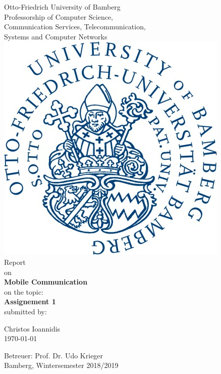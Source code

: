 \documentclass[10pt,a4paper]{article}
\author{Christos Ioannidis}
\begin{document}
\begin{titlepage}
		\begin{center}
		\small Otto-Friedrich University of Bamberg\\
		\vspace{5mm}
		\LARGE Professorship of Computer Science,\\
		Communication Services, Telecommunication,\\
		Systems and Computer Networks\\
		\vspace{8mm}
		\includegraphics[scale=0.15]{images/uniBaLogo.png}\\
		\vspace{10mm}
		\LARGE Report\\
		\vspace{2mm}
		\small on\\
		\vspace{5mm}
		\LARGE \textbf{Mobile Communication}\\
		\vspace{15mm}
		\normalsize on the topic:\\
		\vspace{5mm}
		\huge \textbf{Assignement 1} \\
		\vspace{5mm}
		\small submitted by:\\
		\vspace{5mm}
		
		Christos Ioannidis\\
		\vspace{5mm}
		\today
		
		\vspace{10mm}
		
		\small Betreuer: Prof. Dr. Udo Krieger\\
		\vspace{2mm}
		Bamberg, Wintersemester 2018/2019
		
	\end{center}
\end{titlepage}
\end{document}
